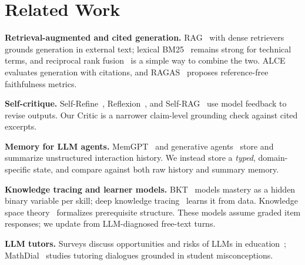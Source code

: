 \section{Related Work}
\textbf{Retrieval-augmented and cited generation.} RAG~\cite{lewis2020rag} with dense retrievers~\cite{karpukhin2020dpr} grounds generation in external text; lexical BM25~\cite{robertson2009bm25} remains strong for technical terms, and reciprocal rank fusion~\cite{cormack2009rrf} is a simple way to combine the two. ALCE~\cite{gao2023alce} evaluates generation with citations, and RAGAS~\cite{es2024ragas} proposes reference-free faithfulness metrics. 

\textbf{Self-critique.} Self-Refine~\cite{madaan2023selfrefine}, Reflexion~\cite{shinn2023reflexion}, and Self-RAG~\cite{asai2024selfrag} use model feedback to revise outputs. Our Critic is a narrower claim-level grounding check against cited excerpts.

\textbf{Memory for LLM agents.} MemGPT~\cite{packer2023memgpt} and generative agents~\cite{park2023generative} store and summarize unstructured interaction history. We instead store a \emph{typed}, domain-specific state, and compare against both raw history and summary memory.

\textbf{Knowledge tracing and learner models.} BKT~\cite{corbett1994bkt} models mastery as a hidden binary variable per skill; deep knowledge tracing~\cite{piech2015dkt} learns it from data. Knowledge space theory~\cite{doignon1985spaces} formalizes prerequisite structure. These models assume graded item responses; we update from LLM-diagnosed free-text turns.

\textbf{LLM tutors.} Surveys discuss opportunities and risks of LLMs in education~\cite{kasneci2023chatgpt}; MathDial~\cite{macina2023mathdial} studies tutoring dialogues grounded in student misconceptions. 
